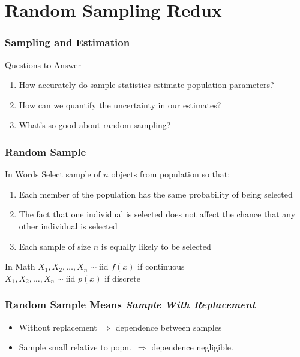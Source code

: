 \documentclass[handout]{beamer}
\begin{document}
\section{Random Sampling Redux}
\begin{frame}
  \frametitle{Sampling and Estimation}
  \begin{block}{Questions to Answer}
  \begin{enumerate}
    \item How accurately do sample statistics estimate population parameters?
    \item How can we quantify the uncertainty in our estimates?
    \item What's so good about random sampling?
  \end{enumerate}
  \end{block}
\end{frame}

\begin{frame}
\frametitle{Random Sample}

\begin{block}{In Words}
Select sample of $n$ objects from  population so that:
	\begin{enumerate}
\item Each member of the population has the same probability of being selected 
\item The fact that one individual is selected does not affect the chance that any other individual is selected
\item Each sample of size $n$ is equally likely to be selected

\end{enumerate}
\end{block}

\begin{alertblock}{In Math}
	$X_1, X_2, \hdots, X_n \sim \mbox{iid } f(x)$ if continuous\\
  $X_1, X_2, \hdots, X_n \sim \mbox{iid } p(x)$ if discrete
\end{alertblock}

\end{frame}

\begin{frame}
  \frametitle{Random Sample Means \emph{Sample With Replacement}}


\begin{itemize}
  \item Without replacement $\Rightarrow$ dependence between samples
  \item Sample small relative to popn.\ $\Rightarrow$ dependence negligible.
\end{itemize}
\end{frame}
\end{document}
